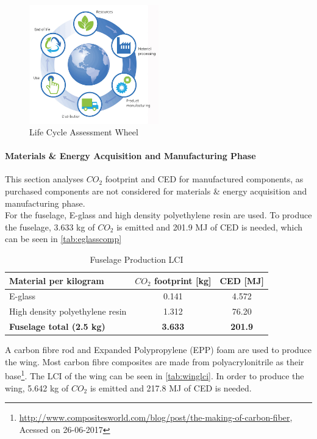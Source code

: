 \begin{figure}[H]
    \centering
    \includegraphics[width=0.5\textwidth]{LifeCycleAssessment/Figures/lcadiagram.jpg}
    \caption{Life Cycle Assessment Wheel}
    \label{fig:lcawheel}
\end{figure}

\paragraph{Materials \& Energy Acquisition and Manufacturing Phase} This section analyses $CO_{2}$ footprint and CED for manufactured components, as purchased components are not considered for materials \& energy acquisition and manufacturing phase.\\
For the fuselage, E-glass and high density polyethylene resin are used. To produce the fuselage, 3.633 kg of $CO_{2}$ is emitted and 201.9 MJ of CED is needed, which can be seen in \autoref{tab:eglasscomp}

\begin{table}[H]
\centering
\caption{Fuselage Production LCI}
\label{tab:eglasscomp}
    \begin{tabular}{lcc}
    \toprule
    Material per kilogram         &$ CO_{2}$ footprint [kg] & CED [MJ]  \\\midrule
    E-glass                         & 0.141                & 4.572    \\\hdashline
    High density polyethylene resin & 1.312                & 76.20    \\\hline \hline
    \textbf{Fuselage total (2.5 kg)}                 & \textbf{3.633}                & \textbf{201.9}   \\\bottomrule
    \end{tabular}
\end{table}

A carbon fibre rod and Expanded Polypropylene (EPP) foam are used to produce the wing. Most carbon fibre composites are made from polyacrylonitrile as their base\footnote{\url{http://www.compositesworld.com/blog/post/the-making-of-carbon-fiber}, Acessed on 26-06-2017}. The LCI of the wing can be seen in \autoref{tab:winglci}. In order to produce the wing, 5.642 kg of $CO_{2}$ is emitted and 217.8 MJ of CED is needed.

